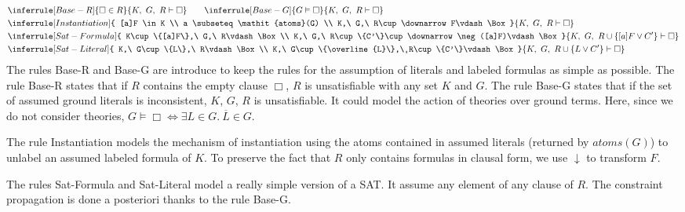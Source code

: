 \documentclass[a4paper,10pt]{report}
\newcommand{\atoms}{\mathit{atoms}}
\newcommand{\gen}{\vdash}
\begin{document}
\begin{eqnarray*}
&
\inferrule [Base-R]{
\Box\in R
}{
K,\ G,\ R\gen\Box
}\qquad
\inferrule [Base-G]{
G\vDash \Box
}{
K,\ G,\ R\gen\Box
}\\
&
\inferrule [Instantiation]{
[a]F \in K  \\ a \subseteq \atoms(G) \\ K,\ G,\ R\cup\downarrow F\gen\Box
}{
K,\ G,\ R\gen\Box
}\\
&
\inferrule [Sat-Formula]{
K\cup\{[a]F\},\ G,\ R\gen\Box\\ K,\ G,\ R\cup\{C'\}\cup \downarrow\neg([a]F)\gen\Box
}{
K,\ G,\ R\cup\{[a]F\vee C'\}\gen\Box
}\\
&
\inferrule [Sat-Literal]{
K,\ G\cup\{L\},\ R\gen\Box\\ K,\ G\cup\{\overline{L}\},\ R\cup\{C'\}\gen\Box
}{
K,\ G,\ R\cup\{L\vee C'\}\gen\Box
}
\end{eqnarray*}
The rules {\sc Base-R} and {\sc Base-G} are introduce to keep the rules for the assumption of
literals and labeled formulas as simple as possible. The rule {\sc Base-R} states that if $R$
contains the empty clause $\Box$, $R$ is unsatisfiable with any set $K$ and $G$. The rule {\sc Base-G}
states that if the set of assumed ground literals is inconsistent, $K$, $G$, $R$ is unsatisfiable.
It could model the action of theories over ground terms. Here, since we do not consider theories,
$G\vDash \Box\Leftrightarrow\exists L\in G.\ \overline L\in G$.

The rule {\sc Instantiation} models the mechanism of instantiation using the atoms contained in
assumed literals (returned by $\atoms(G)$) to unlabel an assumed labeled formula of $K$.
To preserve the fact that $R$ only contains formulas in clausal form, we use $\downarrow$
to transform $F$.

The rules {\sc Sat-Formula} and {\sc Sat-Literal} model a really simple version of a SAT. It assume
any element of any clause of $R$. The constraint propagation is done a posteriori thanks to the rule
{\sc Base-G}.
\end{document}

